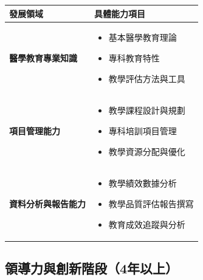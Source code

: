 \documentclass[12pt,a4paper]{article}
\begin{document}
\begin{longtable}{P{4cm}P{12cm}}
\toprule
\textbf{發展領域} & \textbf{具體能力項目} \\
\midrule
\endhead

\textbf{醫學教育專業知識} &
\begin{itemize}[leftmargin=*,itemsep=1pt,parsep=0pt]
  \item 基本醫學教育理論
  \item 專科教育特性
  \item 教學評估方法與工具
\end{itemize} \\
\midrule

\textbf{項目管理能力} &
\begin{itemize}[leftmargin=*,itemsep=1pt,parsep=0pt]
  \item 教學課程設計與規劃
  \item 專科培訓項目管理
  \item 教學資源分配與優化
\end{itemize} \\
\midrule

\textbf{資料分析與報告能力} &
\begin{itemize}[leftmargin=*,itemsep=1pt,parsep=0pt]
  \item 教學績效數據分析
  \item 教學品質評估報告撰寫
  \item 教育成效追蹤與分析
\end{itemize} \\
\bottomrule

\end{longtable}

\subsection{領導力與創新階段（4年以上）}
\end{document}
